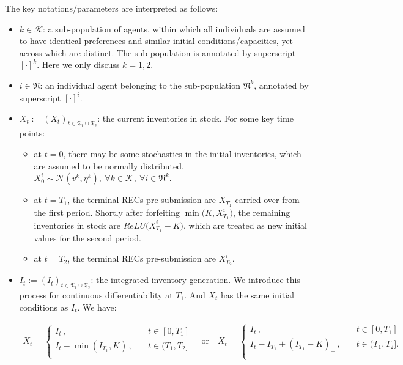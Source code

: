 \documentclass[a4paper,10pt]{article}
\newcommand{\1}{\mathbf{1}}
\begin{document}
The key notations/parameters are interpreted as follows:

\begin{itemize}
\item
  \(k \in \mathcal{K}\): a sub-population of agents, within which all
  individuals are assumed to have identical preferences and similar
  initial conditions/capacities, yet across which are distinct. The
  sub-population is annotated by superscript \([\cdot]^{k}\). Here we
  only discuss \(k=1,2\).
\item
  \(i \in \mathfrak{N}\): an individual agent belonging to the
  sub-population \(\mathfrak{N}^k\), annotated by superscript
  \([\cdot]^{i}\).
\item
  \(X_t := (X_t)_{t\in\mathfrak{T_1} \cup \mathfrak{T_2}}\): the current
  inventories in stock. For some key time points:

  \begin{itemize}
  \item
    at \(t=0\), there may be some stochastics in the initial
    inventories, which are assumed to be normally distributed.
    \(X_0^{i} \sim \mathcal{N}(v^k, \eta^k) ,~ \forall k \in \mathcal{K},~\forall i \in \mathfrak{N}^k\).
  \item
    at \(t=T_1\), the terminal RECs pre-submission are \(X_{T_1}\)
    carried over from the first period. Shortly after forfeiting
    \(\min\Big(K,X^i_{T_1}\Big)\), the remaining inventories in stock
    are \(ReLU\Big(X^i_{T_1}-K\Big)\), which are treated as new initial
    values for the second period.
  \item
    at \(t=T_2\), the terminal RECs pre-submission are \(X^i_{T_2}\).
  \end{itemize}
\item
  \(I_t := (I_t)_{t\in\mathfrak{T_1} \cup \mathfrak{T_2}}\): the
  integrated inventory generation. We introduce this process for
  continuous differentiability at \(T_1\). And \(X_t\) has the same
  initial conditions as \(I_t\). We have:

\begin{align}
    X_t=
    \begin{cases}
        I_t\, ,                  \quad& t \in [0,T_1]\\
        I_t- \min(I_{T_1},K)\, , \quad& t \in (T_1,T_2]\\
    \end{cases} 
    \quad\text{or}\quad
    X_t=
    \begin{cases}
        I_t\, ,                       \quad& t \in [0,T_1]\\
        I_t-I_{T_1}+(I_{T_1}-K)_+\, , \quad& t \in (T_1,T_2].\\
    \end{cases} 
\end{align}


\end{itemize}
\end{document}
